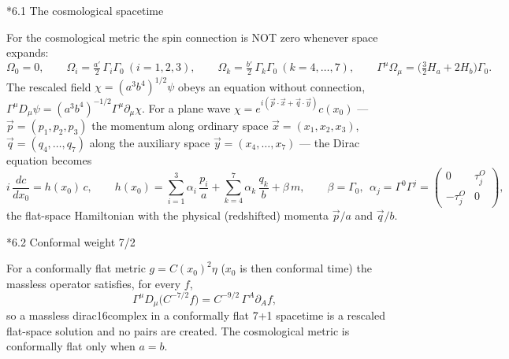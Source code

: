 \documentclass[10pt,a4paper]{article}
\makeatletter
\renewcommand\subsection{\@startsection{subsection}{2}{\z@}{-3.25ex\@plus -1ex \@minus -.2ex}{1.5ex \@plus .2ex}{\normalfont\large\bfseries\raggedright}}
\makeatother
\begin{document}
\subsection*{6.1 The cosmological spacetime}
For the cosmological metric the spin connection is NOT zero whenever space expands:
\begin{equation*}
\Omega_0=0,\qquad \Omega_i=\tfrac{a'}{2}\,\Gamma_i\Gamma_0\ (i=1,2,3),\qquad \Omega_k=\tfrac{b'}{2}\,\Gamma_k\Gamma_0\ (k=4,\dots,7),\qquad \Gamma^\mu\Omega_\mu=\Big(\tfrac32H_a+2H_b\Big)\Gamma_0 .
\end{equation*}
The rescaled field $\chi=(a^3b^4)^{1/2}\psi$ obeys an equation without connection, $\Gamma^\mu D_\mu\psi=(a^3b^4)^{-1/2}\Gamma^\mu\partial_\mu\chi$. For a plane wave $\chi=e^{i(\vec p\cdot\vec x+\vec q\cdot\vec y)}c(x_0)$ — $\vec p=(p_1,p_2,p_3)$ the momentum along ordinary space $\vec x=(x_1,x_2,x_3)$, $\vec q=(q_4,\dots,q_7)$ along the auxiliary space $\vec y=(x_4,\dots,x_7)$ — the Dirac equation becomes
\begin{equation*}
i\,\frac{dc}{dx_0}=h(x_0)\,c,\qquad h(x_0)=\sum_{i=1}^{3}\alpha_i\,\frac{p_i}{a}+\sum_{k=4}^{7}\alpha_k\,\frac{q_k}{b}+\beta\,m,\qquad \beta=\Gamma_0,\ \ \alpha_j=\Gamma^0\Gamma^j=\begin{pmatrix}0&\tau^O_j\\-\tau^O_j&0\end{pmatrix},
\end{equation*}
the flat-space Hamiltonian with the physical (redshifted) momenta $\vec p/a$ and $\vec q/b$.

\subsection*{6.2 Conformal weight 7/2}
For a conformally flat metric $g=C(x_0)^2\eta$ ($x_0$ is then conformal time) the massless operator satisfies, for every $f$,
\begin{equation*}
\Gamma^\mu D_\mu\big(C^{-7/2}f\big)=C^{-9/2}\,\Gamma^A\partial_Af,
\end{equation*}
so a massless dirac16complex in a conformally flat 7+1 spacetime is a rescaled flat-space solution and no pairs are created. The cosmological metric is conformally flat only when $a=b$.
\end{document}
